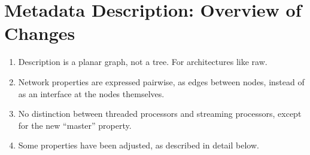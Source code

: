 \section{Metadata Description:  Overview of Changes}

\begin{enumerate}

\item Description is a planar graph, not a tree.  For architectures
like raw.

\item Network properties are expressed pairwise, as edges between
nodes, instead of as an interface at the nodes themselves.

\item No distinction between threaded processors and streaming
processors, except for the new ``master'' property.

\item Some properties have been adjusted, as described in detail
below.

\end{enumerate}